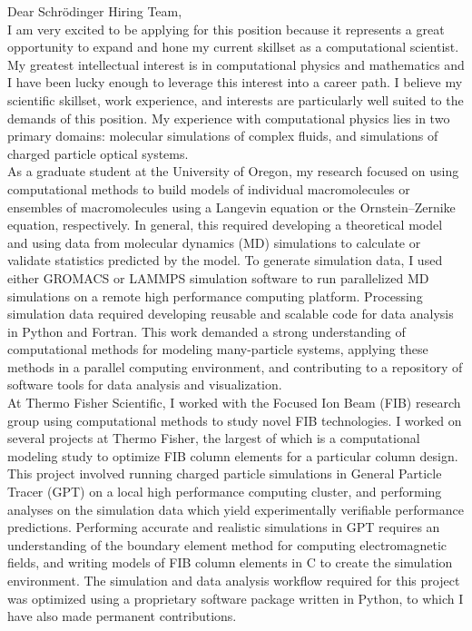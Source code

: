 \documentclass[]{letter}
\begin{document}

Dear Schrödinger Hiring Team, \\

I am very excited to be applying for this position because it represents a great opportunity to expand and hone my current skillset as a computational scientist. My greatest intellectual interest is in computational physics and mathematics and I have been lucky enough to leverage this interest into a career path. I believe my scientific skillset, work experience, and interests are particularly well suited to the demands of this position. My experience with computational physics lies in two primary domains: molecular simulations of complex fluids, and simulations of charged particle optical systems. \\

As a graduate student at the University of Oregon, my research focused on using computational methods to build models of individual macromolecules or ensembles of macromolecules using a Langevin equation or the Ornstein–Zernike equation, respectively. In general, this required developing a theoretical model and using data from molecular dynamics (MD) simulations to calculate or validate statistics predicted by the model. To generate simulation data, I used either GROMACS or LAMMPS simulation software to run parallelized MD simulations on a remote high performance computing platform. Processing simulation data required developing reusable and scalable code for data analysis in Python and Fortran. This work demanded a strong understanding of computational methods for modeling many-particle systems, applying these methods in a parallel computing environment, and contributing to a repository of software tools for data analysis and visualization. \\

At Thermo Fisher Scientific, I worked with the Focused Ion Beam (FIB) research group using computational methods to study novel FIB technologies. I worked on several projects at Thermo Fisher, the largest of which is a computational modeling study to optimize FIB column elements for a particular column design. This project involved running charged particle simulations in General Particle Tracer (GPT) on a local high performance computing cluster, and performing analyses on the simulation data which yield experimentally verifiable performance predictions. Performing accurate and realistic simulations in GPT requires an understanding of the boundary element method for computing electromagnetic fields, and writing models of FIB column elements in C to create the simulation environment. The simulation and data analysis workflow required for this project was optimized using a proprietary software package written in Python, to which I have also made permanent contributions. \\
\end{document}
